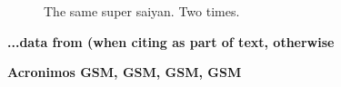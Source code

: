 \begin{figure}[!ht]
    \centering
    \qquad
    \caption[Short Caption]{The same super saiyan. Two times.}        
    \label{fig:test2}
\end{figure}

\textbf{...data from \citet{Ebejer2012} (when citing as part of text, otherwise \citep{Ebejer2012}}


\textbf{Acronimos \acs{GSM}, \ac{GSM}, \ac{GSM}, \acf{GSM}}
